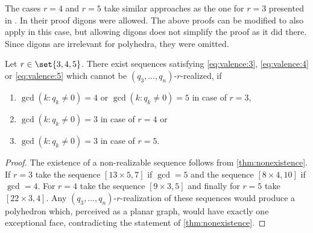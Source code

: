 \begin{remark}
  The cases $r=4$ and $r=5$ take similar approaches as the one for $r=3$ presented in \cite{ConvexPolytopes}. In their proof digons were allowed. The above proofs can be modified to also apply in this case, but allowing digons does not simplify the proof as it did there. Since digons are irrelevant for polyhedra, they were omitted.
\end{remark}
\newpage
\begin{corollary}
  Let $r \in \set{3, 4, 5}$. There exist sequences satisfying \autoref{eq:valence:3}, \autoref{eq:valence:4} or \autoref{eq:valence:5} which cannot be $(q_3, \dots, q_n)$-$r$-realized, if 
  \begin{enumerate}[label=(\roman*)]
    \item $\gcd (k : q_k \neq 0) = 4$ or $\gcd (k : q_k \neq 0) = 5$ in case of $r = 3$, 
    \item $\gcd (k : q_k \neq 0) = 3$ in case of $r = 4$ or 
    \item $\gcd (k : q_k \neq 0) = 3$ in case of $r = 5$. 
  \end{enumerate}
  \begin{proof}
The existence of a non-realizable sequence follows from \autoref{thm:nonexistence}. If $r=3$ take the sequence $[13 \times 5, 7]$ if $\gcd = 5$ and the sequence $[8 \times 4, 10]$ if $\gcd = 4$. For $r=4$ take the sequence $[9 \times 3, 5]$ and finally for $r=5$ take $[22 \times 3, 4]$. Any $(q_3, \dots, q_n)$-$r$-realization of these sequences would produce a polyhedron which, perceived as a planar graph, would have exactly one exceptional face, contradicting the statement of \autoref{thm:nonexistence}.
  \end{proof}
\end{corollary}
